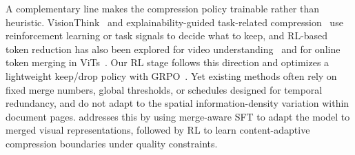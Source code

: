 A complementary line makes the compression policy trainable rather than heuristic. VisionThink~\cite{yang2025visionthink} and explainability-guided task-related compression~\cite{lei2026taskrelated} use reinforcement learning or task signals to decide what to keep, and RL-based token reduction has also been explored for video understanding~\cite{wang2026score,marc2025} and for online token merging in ViTs~\cite{dora2026}. Our RL stage follows this direction and optimizes a lightweight keep/drop policy with GRPO~\cite{shao2024deepseekmath}. Yet existing methods often rely on fixed merge numbers, global thresholds, or schedules designed for temporal redundancy, and do not adapt to the spatial information-density variation within document pages. \ours{} addresses this by using merge-aware SFT to adapt the model to merged visual representations, followed by RL to learn content-adaptive compression boundaries under quality constraints.
